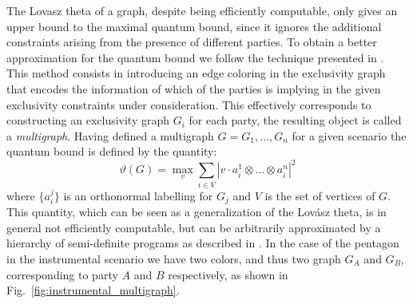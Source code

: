 \documentclass[letterpaper]{article}
\begin{document}
The Lovasz theta of a graph, despite being efficiently computable, only gives an upper bound to the maximal quantum bound, since it ignores the additional constraints arising from the presence of different parties. To obtain a better approximation for the quantum bound we follow the technique presented
in \cite{rabelo2014}. This method consists in introducing an edge coloring in the exclusivity graph that encodes the information of which of the parties is implying in the given exclusivity constraints under consideration. This effectively corresponds to constructing an exclusivity graph $G_i$ for each
party, the resulting object is called a \emph{multigraph}. Having defined a multigraph $G = {G_1, \ldots, G_n}$ for a given scenario the
quantum bound is defined by the quantity:
\begin{equation}
    \vartheta(G) = \max_{v} \sum_{i \in V} |v \cdot a^1_i \otimes \dots \otimes a^n_i|^2
    \label{eq:multigraph_lovazs}
\end{equation}
where $\{a^j_i\}$ is an orthonormal labelling for $G_j$ and $V$ is the set of vertices of $G$. This quantity, which can be seen as a generalization of the Lov\'asz theta, is in general not efficiently computable, but can be arbitrarily approximated by a hierarchy of semi-definite programs as described in \cite{rabelo2014}.
In the case of the pentagon in the instrumental scenario we have two colors, and thus two graph $G_A$ and $G_B$, corresponding to party $A$ and $B$ respectively, as shown in Fig.~\ref{fig:instrumental_multigraph}.
\end{document}
